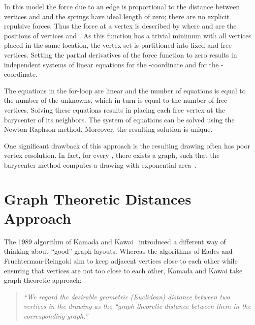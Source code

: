 \documentclass[notitlepage,letter,11pt]{article}
\begin{document}
In this model the force due to an edge  is proportional to the
distance between vertices  and  and the springs have ideal
length of zero; there are no explicit repulsive forces. Thus the force
at a vertex  is described by 
where  and  are the positions of vertices  and . As
this function has a trivial minimum with all vertices placed in the
same location, the vertex set is partitioned into fixed and free
vertices. Setting the partial derivatives of the force function to
zero results in independent systems of linear equations for the
-coordinate and for the -coordinate.

The equations in the for-loop are linear and the number of equations
is equal to the number of the unknowns, which in turn is equal to the
number of free vertices. Solving these equations results in placing
each free vertex at the barycenter of its neighbors. The system of
equations can be solved using the Newton-Raphson method. Moreover, the
resulting solution is unique. 

One significant drawback of this approach is the resulting drawing
often has poor vertex resolution. In fact, for every , there
exists a graph, such that the barycenter method computes a drawing
with exponential area~\cite{conf/gd/EadesG95}.

\section{Graph Theoretic Distances Approach}
\label{fd:sec:kk}

The 1989 algorithm of Kamada and Kawai~\cite{kk-adgug-89} introduced a
different way of thinking about ``good'' graph layouts. Whereas the
algorithms of Eades and Fruchterman-Reingold aim to keep adjacent
vertices close to each other while ensuring that vertices are not too
close to each other, Kamada and Kawai take graph theoretic approach:

\begin{quote}
{\em ``We regard the desirable geometric (Euclidean) distance between
two vertices in the drawing as the ``graph theoretic distance between
them in the corresponding graph.''}
\end{quote}
\end{document}
